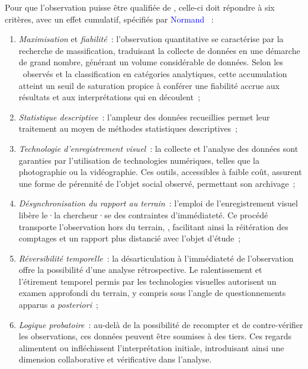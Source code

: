 \begin{refsegment}
Pour que l'observation puisse être qualifiée de , celle-ci doit répondre à six critères, avec un effet cumulatif, spécifiés par \textcolor{blue}{Normand} \textcolor{blue}{\textcite[42-44]{filion_compter_2011}}~:
\begin{enumerate}
    \item \textsl{Maximisation} et \textsl{fiabilité}~: l'observation quantitative se caractérise par la recherche de massification, traduisant la collecte de données en une démarche de grand nombre, générant un volume considérable de données. Selon les ~observés et la classification en catégories analytiques, cette accumulation atteint un seuil de saturation propice à conférer une fiabilité accrue aux résultats et aux interprétations qui en découlent~;
    \item \textsl{Statistique descriptive}~: l'ampleur des données recueillies permet leur traitement au moyen de méthodes statistiques descriptives~;
    \item \textsl{Technologie d'enregistrement visuel}~: la collecte et l'analyse des données sont garanties par l'utilisation de technologies numériques, telles que la photographie ou la vidéographie. Ces outils, accessibles à faible coût, assurent une forme de pérennité de l'objet social observé, permettant son archivage~;
    \item \textsl{Désynchronisation du rapport au terrain}~: l'emploi de l'enregistrement visuel libère le·la chercheur·se des contraintes d'immédiateté. Ce procédé transporte l'observation hors du terrain, , facilitant ainsi la réitération des comptages et un rapport plus distancié avec l'objet d'étude~;
    \item \textsl{Réversibilité temporelle}~: la désarticulation à l'immédiateté de l'observation offre la possibilité d'une analyse rétrospective. Le ralentissement et l'étirement temporel permis par les technologies visuelles autorisent un examen approfondi du terrain, y compris sous l'angle de questionnements apparus \textsl{a posteriori}~;
    \item \textsl{Logique probatoire}~: au-delà de la possibilité de recompter et de contre-vérifier les observations, ces données peuvent être soumises à des tiers. Ces regards alimentent ou infléchissent l'interprétation initiale, introduisant ainsi une dimension collaborative et vérificative dans l'analyse.
\end{enumerate}%


\end{refsegment}
